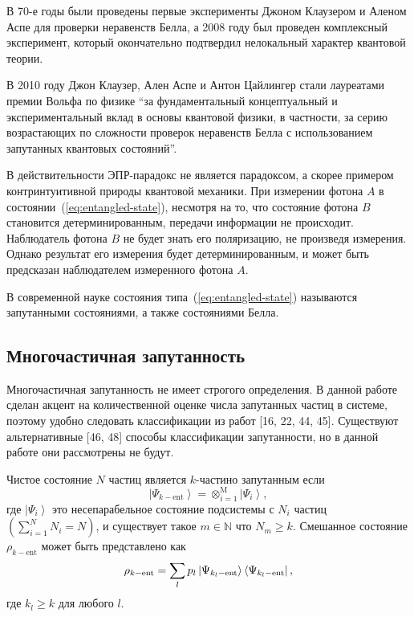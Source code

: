 В 70-е годы были проведены первые эксперименты\cite{Alain1976} Джоном Клаузером и Аленом Аспе для проверки неравенств Белла, 
а 2008 году был проведен комплексный эксперимент\cite{Scheidl2010}, 
который окончательно подтвердил нелокальный характер квантовой теории. 

В 2010 году Джон Клаузер, Ален Аспе и Антон Цайлингер стали лауреатами премии Вольфа по физике ``за фундаментальный концептуальный и экспериментальный вклад в основы квантовой физики, в частности, за серию возрастающих по сложности проверок неравенств Белла с использованием запутанных квантовых состояний''.  

В действительности  ЭПР-парадокс не является парадоксом,
а скорее примером контринтуитивной природы квантовой механики. 
При измерении фотона $A$ в состоянии~(\ref{eq:entangled-state}), 
несмотря на то, что состояние фотона $B$ становится детерминированным, 
передачи информации не происходит. 
Наблюдатель фотона $B$ не будет знать его поляризацию, 
не произведя измерения.
Однако результат его измерения будет детерминированным, 
и может быть предсказан наблюдателем измеренного фотона $A$. 

В современной науке состояния типа~(\ref{eq:entangled-state}) называются запутанными состояниями, а также состояниями Белла.  


\subsection{Многочастичная запутанность}

Многочастичная запутанность не имеет строгого определения.
В данной работе сделан акцент на количественной оценке числа запутанных частиц в системе, 
поэтому удобно следовать классификации из работ [16, 22, 44, 45]. 
Существуют альтернативные [46, 48] способы классификации запутанности, 
но в данной работе они рассмотрены не будут. 

\begin{definition}\label{def:manyparticle-entanglement}
  Чистое состояние $N$ частиц является $k$-частино запутанным если
  $$
  \left| \Psi_{k-\mathrm{ent}} \right\rangle
  	= \otimes^\mathrm{M}_{i=1} \left| \Psi_{i} \right\rangle,
  $$
  где $\left| \Psi_{i} \right\rangle$ это несепарабельное состояние подсистемы с $N_i$ частиц
  $\left( \sum_{i=1}^N N_i = N \right)$, 
  и существует такое  $ m \in \mathbb{N}$ что $N_{m} \ge k$.
  Смешанное состояние $\rho_{k-\mathrm{ent}}$ может быть представлено как 
  $$
  \rho_{k-\mathrm{ent}} = 
  \sum\limits_{l} p_l \left| \Psi_{k_l-\mathrm{ent}} \right\rangle\left\langle \Psi_{k_l-\mathrm{ent}} \right|, 
  $$
  где $k_l \geq k$ для любого $l$. 
\end{definition}



